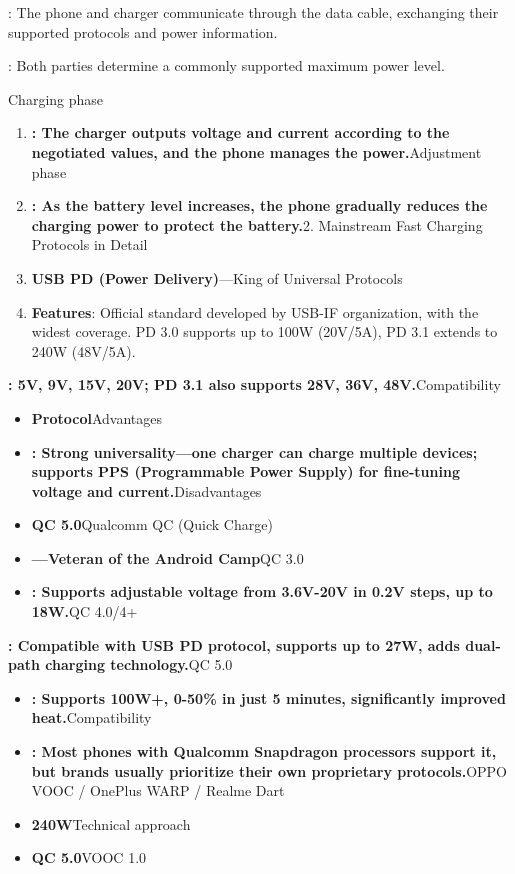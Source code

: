 
: The phone and charger communicate through the data cable, exchanging their supported protocols and power information.


: Both parties determine a commonly supported maximum power level.

Charging phase

\begin{enumerate}
  \item \textbf{: The charger outputs voltage and current according to the negotiated values, and the phone manages the power.}Adjustment phase
  \item \textbf{: As the battery level increases, the phone gradually reduces the charging power to protect the battery.}2. Mainstream Fast Charging Protocols in Detail
  \item \textbf{USB PD (Power Delivery)}—King of Universal Protocols
  \item \textbf{Features}: Official standard developed by USB-IF organization, with the widest coverage. PD 3.0 supports up to 100W (20V/5A), PD 3.1 extends to 240W (48V/5A).
\end{enumerate}


\textbf{: 5V, 9V, 15V, 20V; PD 3.1 also supports 28V, 36V, 48V.}Compatibility

\begin{itemize}
  \item \textbf{Protocol}Advantages
  \item \textbf{: Strong universality—one charger can charge multiple devices; supports PPS (Programmable Power Supply) for fine-tuning voltage and current.}Disadvantages
  \item \textbf{QC 5.0}Qualcomm QC (Quick Charge)
  \item \textbf{—Veteran of the Android Camp}QC 3.0
  \item \textbf{: Supports adjustable voltage from 3.6V-20V in 0.2V steps, up to 18W.}QC 4.0/4+
\end{itemize}

\textbf{: Compatible with USB PD protocol, supports up to 27W, adds dual-path charging technology.}QC 5.0

\begin{itemize}
  \item \textbf{: Supports 100W+, 0-50\% in just 5 minutes, significantly improved heat.}Compatibility
  \item \textbf{: Most phones with Qualcomm Snapdragon processors support it, but brands usually prioritize their own proprietary protocols.}OPPO VOOC / OnePlus WARP / Realme Dart
  \item \textbf{240W}Technical approach
  \item \textbf{QC 5.0}VOOC 1.0
\end{itemize}

